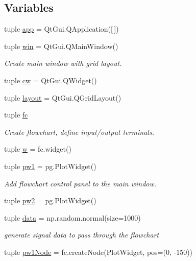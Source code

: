 \subsection*{Variables}
\begin{DoxyCompactItemize}
\item 
tuple \hyperlink{namespaceFlowchart_a1341dbc8fc4a0b646c19b56f288e03bd}{app} = Qt\+Gui.\+Q\+Application(\mbox{[}$\,$\mbox{]})
\item 
tuple \hyperlink{namespaceFlowchart_a0b07efb30fc1f11db38e4e6242d25f89}{win} = Qt\+Gui.\+Q\+Main\+Window()
\begin{DoxyCompactList}\small\item\em Create main window with grid layout. \end{DoxyCompactList}\item 
tuple \hyperlink{namespaceFlowchart_a8c7765a75e5c267970b7a075876dd703}{cw} = Qt\+Gui.\+Q\+Widget()
\item 
tuple \hyperlink{namespaceFlowchart_a7c65bdf9588d2e20126ed9915552be1d}{layout} = Qt\+Gui.\+Q\+Grid\+Layout()
\item 
tuple \hyperlink{namespaceFlowchart_afcff929e4d9621e1fa7a72969e1e247e}{fc}
\begin{DoxyCompactList}\small\item\em Create flowchart, define input/output terminals. \end{DoxyCompactList}\item 
tuple \hyperlink{namespaceFlowchart_adb242633cef63f930a6b70acdbbfec00}{w} = fc.\+widget()
\item 
tuple \hyperlink{namespaceFlowchart_a626e983c67d5de28756f40bf152d7cca}{pw1} = pg.\+Plot\+Widget()
\begin{DoxyCompactList}\small\item\em Add flowchart control panel to the main window. \end{DoxyCompactList}\item 
tuple \hyperlink{namespaceFlowchart_a7312d9e0a403b4d8f1b99a0a65c178eb}{pw2} = pg.\+Plot\+Widget()
\item 
tuple \hyperlink{namespaceFlowchart_a7d5fda16f35dc91fa5fde9e7bb08e1e5}{data} = np.\+random.\+normal(size=1000)
\begin{DoxyCompactList}\small\item\em generate signal data to pass through the flowchart \end{DoxyCompactList}\item 
tuple \hyperlink{namespaceFlowchart_acd2501986ff39a534fd62ecda0487108}{pw1\+Node} = fc.\+create\+Node(\textquotesingle{}Plot\+Widget\textquotesingle{}, pos=(0, -\/150))

\end{DoxyCompactItemize}
